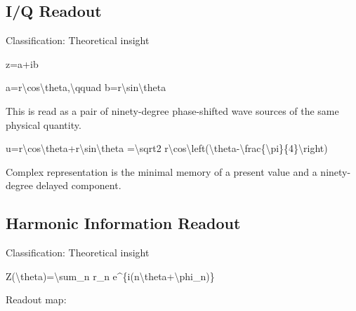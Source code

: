 \documentclass[
  a4paper,
]{article}
\newenvironment{Shaded}{}{}
\newcommand{\NormalTok}[1]{#1}
\begin{document}
\subsection{I/Q Readout}\label{iq-readout}

Classification: Theoretical insight

\begin{Shaded}
\begin{Highlighting}[]
\NormalTok{z=a+ib}
\end{Highlighting}
\end{Shaded}

\begin{Shaded}
\begin{Highlighting}[]
\NormalTok{a=r\textbackslash{}cos\textbackslash{}theta,\textbackslash{}qquad b=r\textbackslash{}sin\textbackslash{}theta}
\end{Highlighting}
\end{Shaded}

This is read as a pair of ninety-degree phase-shifted wave sources of
the same physical quantity.

\begin{Shaded}
\begin{Highlighting}[]
\NormalTok{u=r\textbackslash{}cos\textbackslash{}theta+r\textbackslash{}sin\textbackslash{}theta}
\NormalTok{=\textbackslash{}sqrt2 r\textbackslash{}cos\textbackslash{}left(\textbackslash{}theta{-}\textbackslash{}frac\{\textbackslash{}pi\}\{4\}\textbackslash{}right)}
\end{Highlighting}
\end{Shaded}

Complex representation is the minimal memory of a present value and a
ninety-degree delayed component.

\subsection{Harmonic Information
Readout}\label{harmonic-information-readout}

Classification: Theoretical insight

\begin{Shaded}
\begin{Highlighting}[]
\NormalTok{Z(\textbackslash{}theta)=\textbackslash{}sum\_n r\_n e\^{}\{i(n\textbackslash{}theta+\textbackslash{}phi\_n)\}}
\end{Highlighting}
\end{Shaded}

Readout map:
\end{document}
